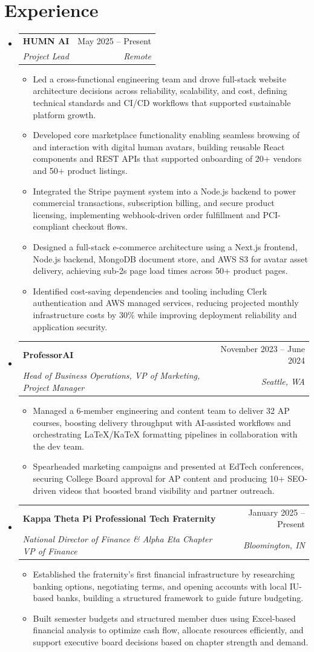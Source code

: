 \documentclass[letterpaper,11pt]{article}
\makeatletter
\newcommand{\resumeItem}[1]{\item\small{#1 \vspace{-2pt}}}
\newcommand{\resumeSubheading}[4]{\vspace{-2pt}\item\begin{tabular*}{0.97\textwidth}[t]{l@{\extracolsep{\fill}}r}\textbf{#1} & #2 \\\textit{\small#3} & \textit{\small #4} \\\end{tabular*}\vspace{-7pt}}
\newcommand{\resumeSubHeadingListStart}{\begin{itemize}[leftmargin=0.15in, label={}]}
\newcommand{\resumeSubHeadingListEnd}{\end{itemize}}
\newcommand{\resumeItemListStart}{\begin{itemize}}
\newcommand{\resumeItemListEnd}{\end{itemize}\vspace{-5pt}}
\makeatother
\begin{document}
\section{Experience}
  \resumeSubHeadingListStart
    \resumeSubheading
      {HUMN AI}{May 2025 -- Present}
      {Project Lead}{Remote}
      \resumeItemListStart
        \resumeItem{Led a cross-functional engineering team and drove full-stack website architecture decisions across reliability, scalability, and cost, defining technical standards and CI/CD workflows that supported sustainable platform growth.}
        \resumeItem{Developed core marketplace functionality enabling seamless browsing of and interaction with digital human avatars, building reusable React components and REST APIs that supported onboarding of 20+ vendors and 50+ product listings.}
        \resumeItem{Integrated the Stripe payment system into a Node.js backend to power commercial transactions, subscription billing, and secure product licensing, implementing webhook-driven order fulfillment and PCI-compliant checkout flows.}
        \resumeItem{Designed a full-stack e-commerce architecture using a Next.js frontend, Node.js backend, MongoDB document store, and AWS S3 for avatar asset delivery, achieving sub-2s page load times across 50+ product pages.}
        \resumeItem{Identified cost-saving dependencies and tooling including Clerk authentication and AWS managed services, reducing projected monthly infrastructure costs by 30\% while improving deployment reliability and application security.}
      \resumeItemListEnd
    \resumeSubheading
      {ProfessorAI}{November 2023 -- June 2024}
      {Head of Business Operations, VP of Marketing, Project Manager}{Seattle, WA}
      \resumeItemListStart
        \resumeItem{Managed a 6-member engineering and content team to deliver 32 AP courses, boosting delivery throughput with AI-assisted workflows and orchestrating LaTeX/KaTeX formatting pipelines in collaboration with the dev team.}
        \resumeItem{Spearheaded marketing campaigns and presented at EdTech conferences, securing College Board approval for AP content and producing 10+ SEO-driven videos that boosted brand visibility and partner outreach.}
      \resumeItemListEnd
    \resumeSubheading
      {Kappa Theta Pi Professional Tech Fraternity}{January 2025 -- Present}
      {National Director of Finance \& Alpha Eta Chapter VP of Finance}{Bloomington, IN}
      \resumeItemListStart
        \resumeItem{Established the fraternity's first financial infrastructure by researching banking options, negotiating terms, and opening accounts with local IU-based banks, building a structured framework to guide future budgeting.}
        \resumeItem{Built semester budgets and structured member dues using Excel-based financial analysis to optimize cash flow, allocate resources efficiently, and support executive board decisions based on chapter strength and demand.}
      \resumeItemListEnd
  \resumeSubHeadingListEnd
\end{document}
